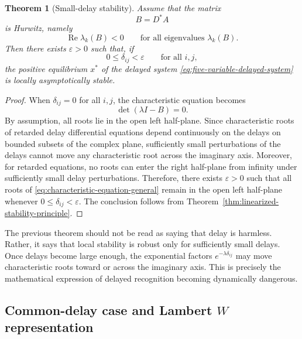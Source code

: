 \documentclass[11pt]{article}
\newtheorem{theorem}{Theorem}
\begin{document}
 \begin{theorem}[Small-delay stability]
 	\label{thm:small-delay-stability}
 	Assume that the matrix
 	\[
 	B=D^\ast A
 	\]
 	is Hurwitz, namely
 	\[
 	\operatorname{Re}\lambda_k(B)<0
 	\qquad
 	\text{for all eigenvalues } \lambda_k(B).
 	\]
 	Then there exists $\varepsilon>0$ such that, if
 	\[
 	0\leq \delta_{ij}<\varepsilon
 	\qquad
 	\text{for all } i,j,
 	\]
 	the positive equilibrium $x^\ast$ of the delayed system
 	\eqref{eq:five-variable-delayed-system} is locally asymptotically stable.
 \end{theorem}
 
 \begin{proof}
 	When $\delta_{ij}=0$ for all $i,j$, the characteristic equation becomes
 	\[
 	\det(\lambda I-B)=0.
 	\]
 	By assumption, all roots lie in the open left half-plane. Since characteristic
 	roots of retarded delay differential equations depend continuously on the
 	delays on bounded subsets of the complex plane, sufficiently small perturbations
 	of the delays cannot move any characteristic root across the imaginary axis.
 	Moreover, for retarded equations, no roots can enter the right half-plane from
 	infinity under sufficiently small delay perturbations. Therefore, there exists
 	$\varepsilon>0$ such that all roots of \eqref{eq:characteristic-equation-general}
 	remain in the open left half-plane whenever
 	$0\leq\delta_{ij}<\varepsilon$. The conclusion follows from
 	Theorem~\ref{thm:linearized-stability-principle}.
 \end{proof}
 

 	The previous theorem should not be read as saying that delay is harmless.
 	Rather, it says that local stability is robust only for sufficiently small
 	delays. Once delays become large enough, the exponential factors
 	$e^{-\lambda\delta_{ij}}$ may move characteristic roots toward or across the
 	imaginary axis. This is precisely the mathematical expression of delayed
 	recognition becoming dynamically dangerous.

 
 \subsection{Common-delay case and Lambert \(W\) representation}
 
\end{document}
